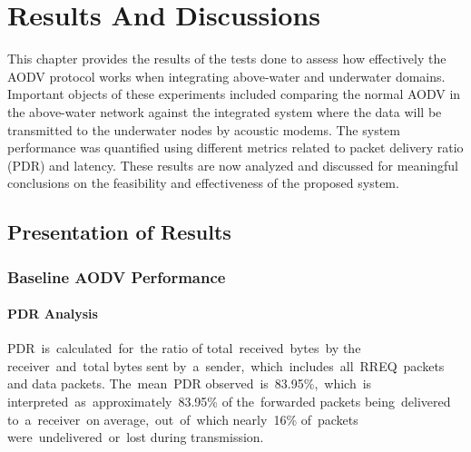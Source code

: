 \documentclass[]{nsm-thesis}
\begin{document}
\chapter{Results And Discussions}
This chapter provides the results of the tests done to assess how effectively the AODV protocol works when integrating above-water and underwater domains. Important objects of these experiments included comparing the normal AODV in the above-water network against the integrated system where the data will be transmitted to the underwater nodes by acoustic modems. The system performance was quantified using different metrics related to packet delivery ratio (PDR) and latency. These results are now analyzed and discussed for meaningful conclusions on the feasibility and effectiveness of the proposed system.
\section{Presentation of Results}
\subsection{Baseline AODV Performance}
\subsubsection{PDR Analysis}
PDR is calculated for the ratio of total received bytes by the receiver and total bytes sent by a sender, which includes all RREQ packets and data packets. The mean PDR observed is 83.95\%, which is interpreted as approximately 83.95\% of the forwarded packets being delivered to a receiver on average, out of which nearly 16\% of packets were undelivered or lost during transmission.
\end{document}
